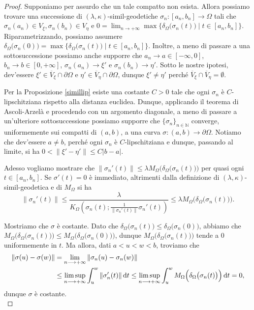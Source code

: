 \begin{proof}
    Supponiamo per assurdo che un tale compatto non esista. Allora possiamo trovare una successione di $(\lambda,\kappa)$-simil-geodetiche $\sigma_n:[a_n,b_n]\longrightarrow\Omega$ tali che $\sigma_n(a_n)\in V_\xi,\sigma_n(b_n)\in V_\eta$ e $\displaystyle0=\lim_{n\rightarrow+\infty}\max\{\delta_\Omega\big(\sigma_n(t)\big) \mid t\in[a_n,b_n]\}$. Riparametrizzando, possiamo assumere $\delta_\Omega\big(\sigma_n(0)\big)=\max\{\delta_\Omega\big(\sigma_n(t)\big) \mid t\in[a_n,b_n]\}$. Inoltre, a meno di passare a una sottosuccessione possiamo anche supporre che $a_n \longrightarrow a\in[-\infty,0]$, $b_n \longrightarrow b\in[0,+\infty]$, $\sigma_n(a_n)\longrightarrow \xi'$ e $\sigma_n(b_n)\longrightarrow\eta'$. Sotto le nostre ipotesi, dev'essere $\xi'\in\overline{V}_\xi\cap\partial\Omega$ e $\eta'\in\overline{V}_\eta\cap\partial\Omega$, dunque $\xi'\not=\eta'$ perché $\overline{V}_\xi\cap\overline{V}_\eta=\emptyset$.

    Per la Proposizione \ref{simillip} esiste una costante $C>0$ tale che ogni $\sigma_n$ è $C$-lipschitziana rispetto alla distanza euclidea. Dunque, applicando il teorema di Ascoli-Arzelà e procedendo con un argomento diagonale, a meno di passare a un'ulteriore sottosuccessione possiamo supporre che $\{\sigma_n\}_{n\in\mathbb{N}}$ converge, uniformemente sui compatti di $(a,b)$, a una curva $\sigma:(a,b)\longrightarrow\partial\Omega$. Notiamo che dev'essere $a\not=b$, perché ogni $\sigma_n$ è $C$-lipschitziana e dunque, passando al limite, si ha $0<\|\xi'-\eta'\|\le C|b-a|$.
    
    Adesso vogliamo mostrare che $\|\sigma_n'(t)\| \le \lambda M_\Omega\Big(\delta_\Omega\big(\sigma_n(t)\big)\Big)$ per quasi ogni $t\in[a_n,b_n]$. Se $\sigma'(t)=0$ è immediato, altrimenti dalla definizione di $(\lambda,\kappa)$-simil-geodetica e di $M_\Omega$ si ha
    $$\|\sigma_n'(t)\| \le \frac{\lambda}{K_\Omega\left(\sigma_n(t);\frac{1}{\|\sigma_n'(t)\|}\sigma_n'(t)\right)} \le \lambda M_\Omega\Big(\delta_\Omega\big(\sigma_n(t)\big)\Big).$$

    Mostriamo che $\sigma$ è costante. Dato che $\delta_\Omega\big(\sigma_n(t)\big) \le \delta_\Omega\big(\sigma_n(0)\big)$, abbiamo che $M_\Omega\Big(\delta_\Omega\big(\sigma_n(t)\big)\Big) \le M_\Omega\Big(\delta_\Omega\big(\sigma_n(0)\big)\Big)$, dunque $M_\Omega\Big(\delta_\Omega\big(\sigma_n(t)\big)\Big)$ tende a $0$ uniformemente in $t$. Ma allora, dati $a<u<w<b$, troviamo che
    \begin{align*}
        \|\sigma(u)-\sigma(w)\|&=\lim_{n\longrightarrow+\infty}\|\sigma_n(u)-\sigma_n(w)\| \\
        &\le \limsup_{n\longrightarrow+\infty}\int_u^w \|\sigma_n'(t)\|\mathop{}\!\mathrm{d} t \le \limsup_{n\longrightarrow+\infty}\int_u^w M_\Omega\Big(\delta_\Omega\big(\sigma_n(t)\big)\Big) \mathop{}\!\mathrm{d} t=0,
    \end{align*}
    dunque $\sigma$ è costante. \\


\end{proof}
